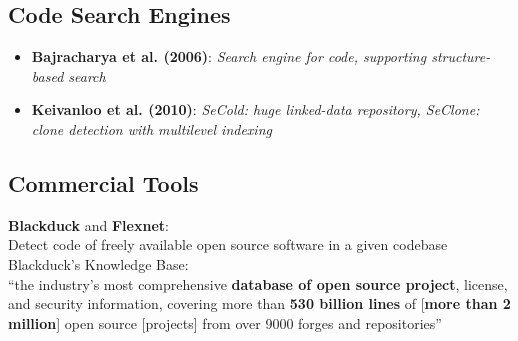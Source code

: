 \subsection{Code Search Engines}
\begin{frame}{\insertsubsection}
	\begin{itemize}
		\item \textbf{Bajracharya et al. \cite{bajracharya2006sourcerer} (2006)}: \textit{Search engine for code, supporting structure-based search}
		\item \textbf{Keivanloo et al. \cite{keivanloo2010semantic, keivanloo2011internet, keivanloo2011seclone, keivanloo2012leveraging} (2010)}: \textit{SeCold: huge linked-data repository, SeClone: clone detection with multilevel indexing}
	\end{itemize}
\end{frame}

\subsection{Commercial Tools}
\begin{frame}{\insertsubsection}
	\textbf{Blackduck} and \textbf{Flexnet}:\\
	Detect code of freely available open source software in a given codebase\\
	\vspace{10mm}
	Blackduck's Knowledge Base: \\
	\enquote{the industry’s most comprehensive \textbf{database of open source project}, license, and security information, covering more than \textbf{530 billion lines} of [\textbf{more than 2 million}] open source [projects] from over 9000 forges and repositories}
\end{frame}